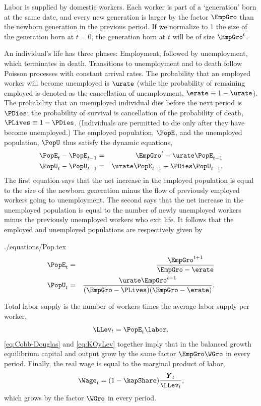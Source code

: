 \documentclass[titlepage]{\econtex}\newcommand{\texname}{cjSOE}
\renewcommand{\GDPLev}{\ensuremath{\pmb{Y}}}
\begin{document}
Labor is supplied by domestic workers. Each worker is part of a `generation' born at the same date, and every new generation is larger by the factor $\EmpGro$ than the newborn generation in the previous period. If we normalize to 1 the size of the generation born at $t=0$, the generation born at $t$ will be of size $\EmpGro^t$.

An individual's life has three phases: Employment, followed by
unemployment, which terminates in death. Transitions to unemployment
and to death follow Poisson processes with constant arrival rates. The
probability that an employed worker will become unemployed is $\urate$
(while the probability of remaining employed is denoted as the cancellation of unemployment, $\erate \equiv 1-\urate$).
The probability that an unemployed individual dies before the next
period is $\PDies$; the probability of survival is
cancellation of the probability of death, $\PLives \equiv 1-\PDies$. (Individuals are
permitted to die only after they have become unemployed.) The employed
population, $\PopE$, and the unemployed population, $\PopU$ thus
satisfy the dynamic equations,
\begin{eqnarray*}
  \PopE_t - \PopE_{t-1} & = & \EmpGro^t-\urate \PopE_{t-1}
\\  \PopU_t - \PopU_{t-1} & = &\urate \PopE_{t-1} - \PDies \PopU_{t-1}.
\end{eqnarray*}
The first equation says that the net increase in the employed population is equal to the size of the newborn generation minus the flow of previously employed workers going to unemployment. The second says that the net increase in the unemployed population is equal to the number of newly unemployed workers minus the previously unemployed workers who exit life. It follows that the employed and unemployed populations are respectively given by
\begin{verbatimwrite}{./equations/Pop.tex}
\begin{eqnarray*}
\PopE_t & = & \frac{\EmpGro^{t+1}}{\EmpGro-\erate} \label{eq:PopEt}
\\ \PopU_t & = & \frac{\urate \EmpGro^{t+1}}{(\EmpGro-\PLives)(\EmpGro-\erate)}. \label{eq:PopUt}
\end{eqnarray*} %
\end{verbatimwrite}


Total labor supply is the number of workers times the average labor supply per worker,
\begin{equation}
\LLev_t = \PopE_t \labor.
\label{eq:Lt}
\end{equation}
\eqref{eq:Cobb-Douglas} and \eqref{eq:KOyLev} together imply that in
the balanced growth equilibrium capital and output grow by the same
factor $\EmpGro \WGro$ in every period.  Finally, the real wage is
equal to the marginal product of labor,
\begin{equation*}
\Wage_t =(1-\kapShare)\frac{\GDPLev_t}{\LLev_t},
\end{equation*}
which grows by the factor $\WGro$ in every period.
\end{document}
